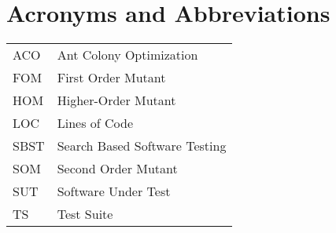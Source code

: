 
\section{Acronyms and Abbreviations}
\label{sec:acronyms}


\begin{tabular}{|p{1.2cm}|p{12cm}|}

ACO & Ant Colony Optimization\\
FOM & First Order Mutant\\
HOM & Higher-Order Mutant\\
LOC & Lines of Code\\
SBST & Search Based Software Testing\\
SOM & Second Order Mutant\\
SUT & Software Under Test\\
TS & Test Suite\\


                                                           
\end{tabular}
\normalsize

\clearpage